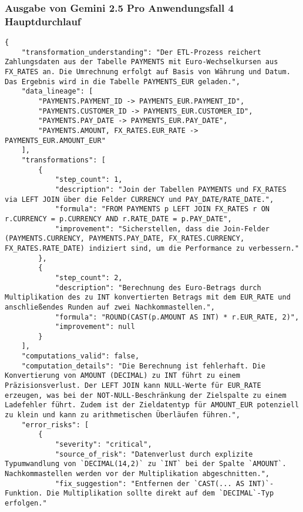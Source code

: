\subsubsection{Ausgabe von Gemini 2.5 Pro Anwendungsfall 4 Hauptdurchlauf}\label{anhang:subsubsec:gemini_case4_prompt1}
\begin{lstlisting}[caption={Ausgabe: Gemini 2.5 Pro Anwendungsfall 4 Hauptdurchlauf},label={gemini_case4_prompt1}]
{
    "transformation_understanding": "Der ETL-Prozess reichert Zahlungsdaten aus der Tabelle PAYMENTS mit Euro-Wechselkursen aus FX_RATES an. Die Umrechnung erfolgt auf Basis von Währung und Datum. Das Ergebnis wird in die Tabelle PAYMENTS_EUR geladen.",
    "data_lineage": [
        "PAYMENTS.PAYMENT_ID -> PAYMENTS_EUR.PAYMENT_ID",
        "PAYMENTS.CUSTOMER_ID -> PAYMENTS_EUR.CUSTOMER_ID",
        "PAYMENTS.PAY_DATE -> PAYMENTS_EUR.PAY_DATE",
        "PAYMENTS.AMOUNT, FX_RATES.EUR_RATE -> PAYMENTS_EUR.AMOUNT_EUR"
    ],
    "transformations": [
        {
            "step_count": 1,
            "description": "Join der Tabellen PAYMENTS und FX_RATES via LEFT JOIN über die Felder CURRENCY und PAY_DATE/RATE_DATE.",
            "formula": "FROM PAYMENTS p LEFT JOIN FX_RATES r ON r.CURRENCY = p.CURRENCY AND r.RATE_DATE = p.PAY_DATE",
            "improvement": "Sicherstellen, dass die Join-Felder (PAYMENTS.CURRENCY, PAYMENTS.PAY_DATE, FX_RATES.CURRENCY, FX_RATES.RATE_DATE) indiziert sind, um die Performance zu verbessern."
        },
        {
            "step_count": 2,
            "description": "Berechnung des Euro-Betrags durch Multiplikation des zu INT konvertierten Betrags mit dem EUR_RATE und anschließendes Runden auf zwei Nachkommastellen.",
            "formula": "ROUND(CAST(p.AMOUNT AS INT) * r.EUR_RATE, 2)",
            "improvement": null
        }
    ],
    "computations_valid": false,
    "computation_details": "Die Berechnung ist fehlerhaft. Die Konvertierung von AMOUNT (DECIMAL) zu INT führt zu einem Präzisionsverlust. Der LEFT JOIN kann NULL-Werte für EUR_RATE erzeugen, was bei der NOT-NULL-Beschränkung der Zielspalte zu einem Ladefehler führt. Zudem ist der Zieldatentyp für AMOUNT_EUR potenziell zu klein und kann zu arithmetischen Überläufen führen.",
    "error_risks": [
        {
            "severity": "critical",
            "source_of_risk": "Datenverlust durch explizite Typumwandlung von `DECIMAL(14,2)` zu `INT` bei der Spalte `AMOUNT`. Nachkommastellen werden vor der Multiplikation abgeschnitten.",
            "fix_suggestion": "Entfernen der `CAST(... AS INT)`-Funktion. Die Multiplikation sollte direkt auf dem `DECIMAL`-Typ erfolgen."

\end{lstlisting}
